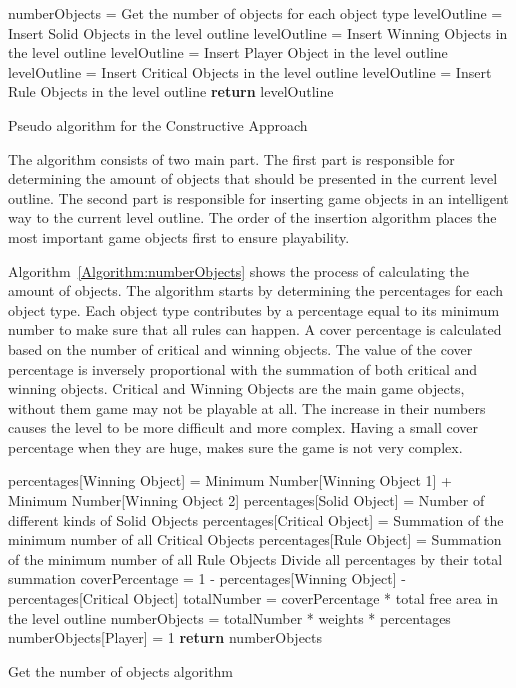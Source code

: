 \documentclass[letterpaper]{article}
\newcommand{\algref}[1]{Algorithm~\ref{Algorithm:#1}}
\begin{document}
\begin{algorithm}[ht]
	\BlankLine
	numberObjects = Get the number of objects for each object type\;
	\BlankLine
	levelOutline = Insert Solid Objects in the level outline\;
	levelOutline = Insert Winning Objects in the level outline\;
	levelOutline = Insert Player Object in the level outline\;
	levelOutline = Insert Critical Objects in the level outline\;
	levelOutline = Insert Rule Objects in the level outline\;
	\BlankLine
	\textbf{return} levelOutline\;
	\caption{Pseudo algorithm for the Constructive Approach}
	\label{Algorithm:constructiveApproach}
\end{algorithm}
The algorithm consists of two main part. The first part is responsible for determining the amount of objects that should be presented in the current level outline. The second part is responsible for inserting game objects in an intelligent way to the current level outline. The order of the insertion algorithm places the most important game objects first to ensure playability.\\\par

\algref{numberObjects} shows the process of calculating the amount of objects. The algorithm starts by determining the percentages for each object type. Each object type contributes by a percentage equal to its minimum number to make sure that all rules can happen. A cover percentage is calculated based on the number of critical and winning objects. The value of the cover percentage is inversely proportional with the summation of both critical and winning objects. Critical and Winning Objects are the main game objects, without them game may not be playable at all. The increase in their numbers causes the level to be more difficult and more complex. Having a small cover percentage when they are huge, makes sure the game is not very complex.\\

\begin{algorithm}[ht]
	\BlankLine
	percentages[Winning Object] = Minimum Number[Winning Object 1] + Minimum Number[Winning Object 2]\;
	percentages[Solid Object] = Number of different kinds of Solid Objects\;
	percentages[Critical Object] = Summation of the minimum number of all Critical Objects\;
	percentages[Rule Object] = Summation of the minimum number of all Rule Objects\;
	Divide all percentages by their total summation\;
	\BlankLine
	coverPercentage = 1 - percentages[Winning Object] - percentages[Critical Object]\;
	totalNumber = coverPercentage * total free area in the level outline\;
	numberObjects = totalNumber * weights * percentages\;
	numberObjects[Player] = 1\;
	\BlankLine
	\textbf{return} numberObjects\;
	\caption{Get the number of objects algorithm}
	\label{Algorithm:numberObjects}
\end{algorithm}
\end{document}

